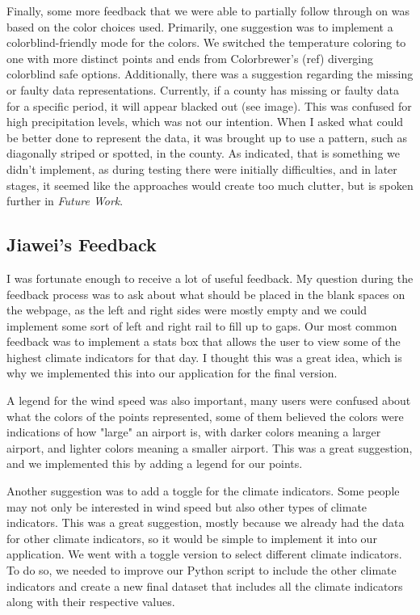 \documentclass[10pt,twocolumn,twoside]{opticajnl}
\begin{document}
Finally, some more feedback that we were able to partially follow through on was based on the color choices used. Primarily, one suggestion was to implement a colorblind-friendly mode for the colors. We switched the temperature coloring to one with more distinct points and ends from Colorbrewer's (ref) diverging colorblind safe options. Additionally, there was a suggestion regarding the missing or faulty data representations. Currently, if a county has missing or faulty data for a specific period, it will appear blacked out (see image). This was confused for high precipitation levels, which was not our intention. When I asked what could be better done to represent the data, it was brought up to use a pattern, such as diagonally striped or spotted, in the county. As indicated, that is something we didn't implement, as during testing there were initially difficulties, and in later stages, it seemed like the approaches would create too much clutter, but is spoken further in \textit{Future Work}.

\subsection{Jiawei's Feedback}
I was fortunate enough to receive a lot of useful feedback. My question during the feedback process was to ask about what should be placed in the blank spaces on the webpage, as the left and right sides were mostly empty and we could implement some sort of left and right rail to fill up to gaps. Our most common feedback was to implement a stats box that allows the user to view some of the highest climate indicators for that day. I thought this was a great idea, which is why we implemented this into our application for the final version.

A legend for the wind speed was also important, many users were confused about what the colors of the points represented, some of them believed the colors were indications of how "large" an airport is, with darker colors meaning a larger airport, and lighter colors meaning a smaller airport. This was a great suggestion, and we implemented this by adding a legend for our points.

Another suggestion was to add a toggle for the climate indicators. Some people may not only be interested in wind speed but also other types of climate indicators. This was a great suggestion, mostly because we already had the data for other climate indicators, so it would be simple to implement it into our application. We went with a toggle version to select different climate indicators. To do so, we needed to improve our Python script to include the other climate indicators and create a new final dataset that includes all the climate indicators along with their respective values. 
\end{document}
